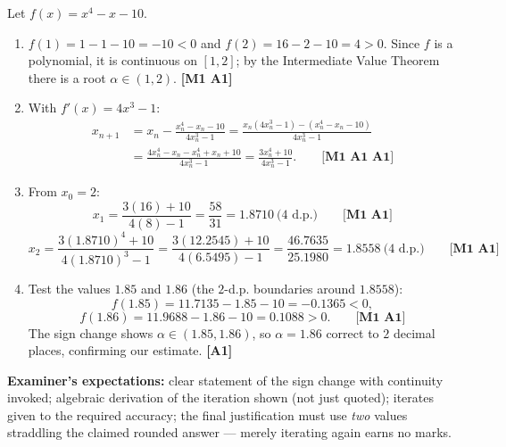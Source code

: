 \documentclass[11pt]{article}
\newcounter{popsec}
\newcounter{popsub}
\newcommand{\courssub}[1]{%
  \stepcounter{popsub}%
  \par\vspace{9pt}\noindent{\popxbold\fontsize{11.5}{13}\selectfont\color{popink}{\color{poporange}\thepopsec.\thepopsub}\hspace{6pt}#1}\par\nopagebreak\vspace{4pt}
}
\begin{document}
\courssub{I prepare for the GCE}

\begin{corrige}
Let $f(x) = x^{4} - x - 10$.
\begin{enumerate}
\item $f(1) = 1 - 1 - 10 = -10 < 0$ and $f(2) = 16 - 2 - 10 = 4 > 0$. Since $f$ is a polynomial, it is continuous on $[1, 2]$; by the Intermediate Value Theorem there is a root $\alpha \in (1, 2)$. \hfill \textbf{[M1 A1]}
\item With $f'(x) = 4x^{3} - 1$:
\begin{align*}
x_{n+1} &= x_{n} - \frac{x_{n}^{4} - x_{n} - 10}{4x_{n}^{3} - 1} = \frac{x_{n}(4x_{n}^{3} - 1) - (x_{n}^{4} - x_{n} - 10)}{4x_{n}^{3} - 1}\\
&= \frac{4x_{n}^{4} - x_{n} - x_{n}^{4} + x_{n} + 10}{4x_{n}^{3} - 1} = \frac{3x_{n}^{4} + 10}{4x_{n}^{3} - 1}. \qquad \textbf{[M1 A1 A1]}
\end{align*}
\item From $x_{0} = 2$:
\[ x_{1} = \frac{3(16) + 10}{4(8) - 1} = \frac{58}{31} = 1.8710 \ \text{(4 d.p.)} \qquad \textbf{[M1 A1]} \]
\[ x_{2} = \frac{3(1.8710)^{4} + 10}{4(1.8710)^{3} - 1} = \frac{3(12.2545) + 10}{4(6.5495) - 1} = \frac{46.7635}{25.1980} = 1.8558 \ \text{(4 d.p.)} \qquad \textbf{[M1 A1]} \]
\item Test the values $1.85$ and $1.86$ (the $2$-d.p. boundaries around $1.8558$):
\[ f(1.85) = 11.7135 - 1.85 - 10 = -0.1365 < 0, \]
\[ f(1.86) = 11.9688 - 1.86 - 10 = 0.1088 > 0. \qquad \textbf{[M1 A1]} \]
The sign change shows $\alpha \in (1.85, 1.86)$, so $\alpha = 1.86$ correct to $2$ decimal places, confirming our estimate. \hfill \textbf{[A1]}
\end{enumerate}
\textbf{Examiner's expectations:} clear statement of the sign change with continuity invoked; algebraic derivation of the iteration shown (not just quoted); iterates given to the required accuracy; the final justification must use \emph{two} values straddling the claimed rounded answer — merely iterating again earns no marks.
\end{corrige}
\end{document}
